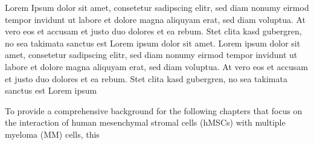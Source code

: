 \documentclass[12pt]{doctoral_thesis_uniwue}
\begin{document}


\newpage



\setcounter{page}{1} %



\newpage



Lorem Ipsum dolor sit amet, consetetur sadipscing elitr, sed diam nonumy
eirmod tempor invidunt ut labore et dolore magna aliquyam erat, sed diam
voluptua. At vero eos et accusam et justo duo dolores et ea rebum. Stet
clita kasd gubergren, no sea takimata sanctus est Lorem ipsum dolor sit
amet. Lorem ipsum dolor sit amet, consetetur sadipscing elitr, sed diam
nonumy eirmod tempor invidunt ut labore et dolore magna aliquyam erat,
sed diam voluptua. At vero eos et accusam et justo duo dolores et ea
rebum. Stet clita kasd gubergren, no sea takimata sanctus est Lorem
ipsum

\newpage



\begin{spacing}{0.01}
    \footnotesize \tableofcontents
\end{spacing}

\newpage


\setcounter{page}{1} %

To provide a comprehensive background for the following chapters that focus on
the interaction of human mesenchymal stromal cells (hMSCs) with multiple myeloma
(MM) cells, this
\end{document}

